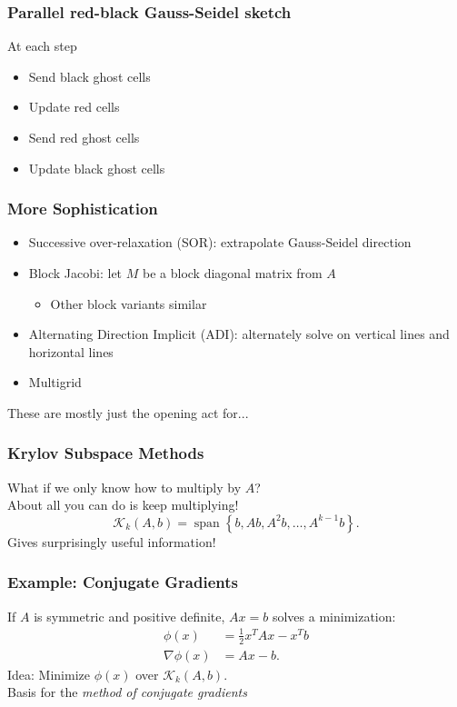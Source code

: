 \documentclass{beamer}
\begin{document}
\begin{frame}
  \frametitle{Parallel red-black Gauss-Seidel sketch}

  At each step
  \begin{itemize}
  \item Send black ghost cells
  \item Update red cells
  \item Send red ghost cells
  \item Update black ghost cells
  \end{itemize}
\end{frame}


\begin{frame}
  \frametitle{More Sophistication}

  \begin{itemize}
  \item Successive over-relaxation (SOR): extrapolate Gauss-Seidel direction
  \item Block Jacobi: let $M$ be a block diagonal matrix from $A$
    \begin{itemize}
    \item Other block variants similar
    \end{itemize}
  \item Alternating Direction Implicit (ADI): alternately solve on vertical
    lines and horizontal lines
  \item Multigrid
  \end{itemize}
  These are mostly just the opening act for...
\end{frame}


\begin{frame}
  \frametitle{Krylov Subspace Methods}

  What if we only know how to multiply by $A$? \\
  About all you can do is keep multiplying!
  \[
    \mathcal{K}_k(A,b) = \operatorname{span}\left\{ 
      b, A b, A^2 b, \ldots, A^{k-1} b \right\}.
  \]
  Gives surprisingly useful information!

\end{frame}


\begin{frame}
  \frametitle{Example: Conjugate Gradients}

  If $A$ is symmetric and positive definite,
  $Ax = b$ solves a minimization:
  \begin{align*}
    \phi(x) &= \frac{1}{2} x^T A x - x^T  b\\
    \nabla \phi(x) &= Ax - b.
  \end{align*}
  Idea: Minimize $\phi(x)$ over $\mathcal{K}_k(A,b)$. \\
  Basis for the {\em method of conjugate gradients}
\end{frame}
\end{document}
